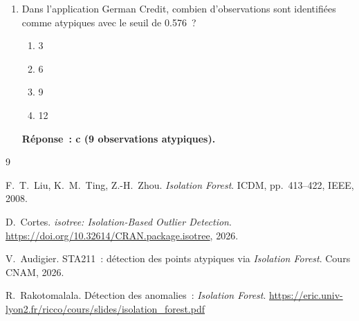 \documentclass[a4paper,11pt]{article}
\theoremstyle{definition}
\theoremstyle{remark}
\begin{document}
\begin{enumerate}
  \item Dans l'application German Credit, combien d'observations sont
    identifi\'ees comme atypiques avec le seuil de 0.576~?
    \begin{enumerate}
      \item 3
      \item 6
      \item 9
      \item 12
    \end{enumerate}
    \textbf{R\'eponse~: c (9 observations atypiques).}

\end{enumerate}

\begin{thebibliography}{9}

  F.~T.~Liu, K.~M.~Ting, Z.-H.~Zhou.
  \newblock \emph{Isolation Forest}.
  \newblock ICDM, pp.~413--422, IEEE, 2008.

  D.~Cortes.
  \newblock \emph{isotree: Isolation-Based Outlier Detection}.
  \newblock \url{https://doi.org/10.32614/CRAN.package.isotree}, 2026.

  V.~Audigier.
  \newblock STA211~: d\'etection des points atypiques via
    \emph{Isolation Forest}.
  \newblock Cours CNAM, 2026.

  R.~Rakotomalala.
  \newblock D\'etection des anomalies~: \emph{Isolation Forest}.
  \newblock \url{https://eric.univ-lyon2.fr/ricco/cours/slides/isolation_forest.pdf}

\end{thebibliography}
\end{document}
